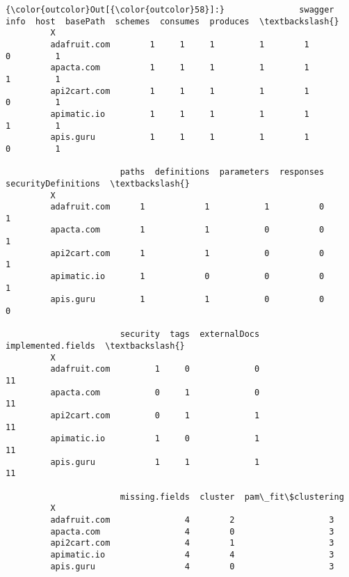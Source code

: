 \documentclass[11pt]{article}
\begin{document}
\begin{Verbatim}[commandchars=\\\{\}]
{\color{outcolor}Out[{\color{outcolor}58}]:}               swagger  info  host  basePath  schemes  consumes  produces  \textbackslash{}
         X                                                                          
         adafruit.com        1     1     1         1        1         0         1   
         apacta.com          1     1     1         1        1         1         1   
         api2cart.com        1     1     1         1        1         0         1   
         apimatic.io         1     1     1         1        1         1         1   
         apis.guru           1     1     1         1        1         0         1   
         
                       paths  definitions  parameters  responses  securityDefinitions  \textbackslash{}
         X                                                                              
         adafruit.com      1            1           1          0                    1   
         apacta.com        1            1           0          0                    1   
         api2cart.com      1            1           0          0                    1   
         apimatic.io       1            0           0          0                    1   
         apis.guru         1            1           0          0                    0   
         
                       security  tags  externalDocs  implemented.fields  \textbackslash{}
         X                                                                
         adafruit.com         1     0             0                  11   
         apacta.com           0     1             0                  11   
         api2cart.com         0     1             1                  11   
         apimatic.io          1     0             1                  11   
         apis.guru            1     1             1                  11   
         
                       missing.fields  cluster  pam\_fit\$clustering  
         X                                                          
         adafruit.com               4        2                   3  
         apacta.com                 4        0                   3  
         api2cart.com               4        1                   3  
         apimatic.io                4        4                   3  
         apis.guru                  4        0                   3  
\end{Verbatim}
            
\end{document}
